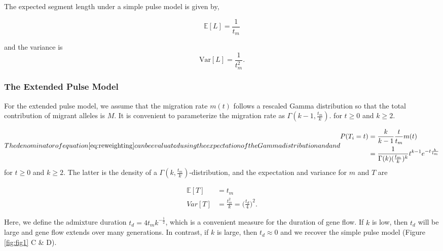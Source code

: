 \documentclass[11pt]{article}
\begin{document}
The expected segment length under a simple pulse model is given by,
	
\begin{equation}
\label{eq:Expected_l_simple_pulse}
\mathbb{E}[L]=\frac{1}{t_m}
\end{equation}
	
and the variance is
\begin{equation}
\label{eq:Expected_v_simple_pulse}
\text{Var}[L]=\frac{1}{t_m^2} \text{.}
\end{equation}
	

\subsubsection{The Extended Pulse Model}\label{The Extended Pulse Model}
	
For the extended pulse model, we assume that the migration rate $m(t)$ follows a rescaled Gamma distribution so that the total contribution of migrant alleles is $M$.  It is convenient to parameterize the migration rate as $\Gamma(k-1,\frac{t_m}{k})$.
for $t \geq 0$ and $k \geq 2$. 

\begin{subequations}
The denominator of equation \ref{eq:reweighting} can be evaluated using the expectation of the Gamma distribution and
and

\begin{align}
    P(T_i=t) &= \frac{k}{k-1}\frac{t }{t_m}m(t)\\
        &=\frac{1}{\Gamma(k)(\frac{t_m}{k})^k}t^{k-1}e^{-t\frac{k}{t_m}} 
\end{align}
\end{subequations}
for $t \geq 0$ and $k \geq 2$. The latter is the density of a $\Gamma(k, \frac{t_m}{k})$-distribution, and the expectation and variance for $m$ and $T$ are 
	
\begin{equation}
\begin{split}
\label{eq:RV_extended_pulse_properties}
\mathbb{E}[T]&=t_{m} \\
	Var[T]&=\frac{t_{m}^2}{k} =
\bigg(\frac{t_d}{4} \bigg)^2 \text{.}
\end{split}
\end{equation}
	
Here, we define the admixture duration $t_d=4t_m k^{-\frac{1}{2}} $, which is a convenient measure for the duration of gene flow. If $k$ is low, then $t_d$ will be large and gene flow extends over many generations. In contrast, if $k$ is large, then $t_d \approx 0$ and we recover the simple pulse model (Figure \ref{fig:fig1} C \& D). 
	
\end{document}
